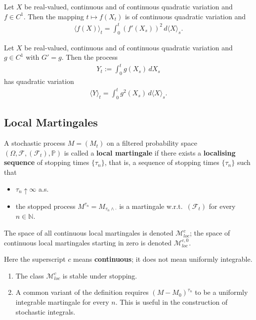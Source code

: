 \begin{proposition}
	Let $X$ be real-valued, continuous and of continuous quadratic variation and $f \in C^1$. Then the mapping $t \mapsto f(X_t)$ is of continuous quadratic variation and
	\begin{align*}
		\langle f(X) \rangle_t = \int_0^t (f'(X_s))^2\, d\langle X \rangle_s.
	\end{align*}
\end{proposition}

\begin{corollary}
	Let $X$ be real-valued, continuous and of continuous quadratic variation and $g \in C^1$ with $G' = g$. Then the process
	\begin{align*}
		Y_t := \int_0^t g(X_s)\, dX_s
	\end{align*}
	has quadratic variation
	\begin{align*}
		\langle Y \rangle_t = \int_0^t g^2(X_s)\, d\langle X \rangle_s.
	\end{align*}
\end{corollary}



\subsection{Local Martingales}
\begin{definition}
	A stochastic process $M = (M_t)$ on a filtered probability space $(\Omega, \mathcal{F}, (\mathcal{F}_t), \mathbb{P})$ is called a \textbf{local martingale} if there exists a \textbf{localising sequence} of stopping times $\{\tau_n\}$, that is, a sequence of stopping times $\{\tau_n\}$ such that
	\begin{itemize}
		\item $\tau_n \uparrow \infty$ a.s.
		\item the stopped process $M^{\tau_n} = M_{\tau_n \wedge \cdot}$ is a martingale w.r.t.\ $(\mathcal{F}_t)$ for every $n \in \mathbb{N}$.
	\end{itemize}
	The space of all continuous local martingales is denoted $\mathcal{M}^c_{loc}$; the space of continuous local martingales starting in zero is denoted $\mathcal{M}^{c,0}_{loc}$.
\end{definition}
\begin{remark}
Here the superscript $c$ means \textbf{continuous}; it does not mean uniformly integrable.
\begin{enumerate}
	\item The class $\mathcal{M}^c_{loc}$ is stable under stopping.
	\item A common variant of the definition requires $(M - M_0)^{\tau_n}$ to be a uniformly integrable martingale for every $n$. This is useful in the construction of stochastic integrals.
\end{enumerate}	
\end{remark}

